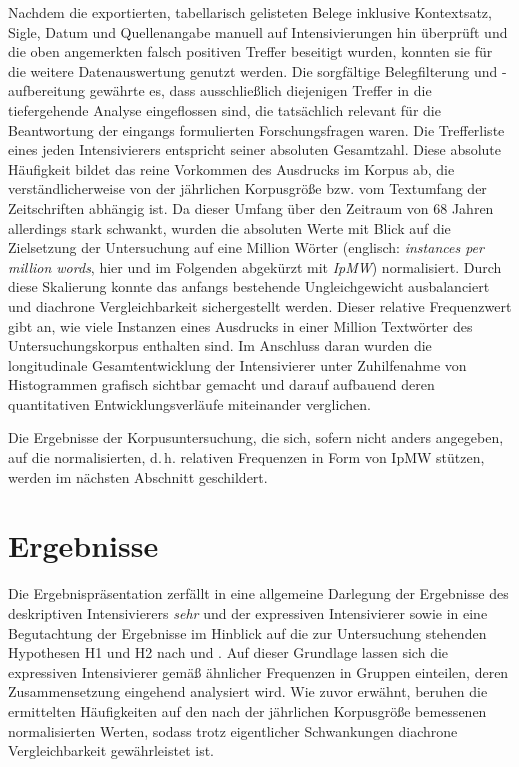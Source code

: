 Nachdem die exportierten, tabellarisch gelisteten Belege inklusive Kontextsatz, Sigle, Datum und Quellenangabe manuell auf Intensivierungen hin überprüft und die oben angemerkten falsch positiven Treffer beseitigt wurden, konnten sie für die weitere Datenauswertung genutzt werden. Die sorgfältige Belegfilterung und -aufbereitung gewährte es, dass ausschließlich diejenigen Treffer in die tiefergehende Analyse eingeflossen sind, die tatsächlich relevant für die Beantwortung der eingangs formulierten Forschungsfragen waren. Die Trefferliste eines jeden Intensivierers entspricht seiner absoluten Gesamtzahl. Diese absolute Häufigkeit bildet das reine Vorkommen des Ausdrucks im Korpus ab, die verständlicherweise von der jährlichen Korpusgröße bzw. vom Textumfang der Zeitschriften abhängig ist. Da dieser Umfang über den Zeitraum von 68 Jahren allerdings stark schwankt, wurden die absoluten Werte mit Blick auf die Zielsetzung der Untersuchung auf eine Million Wörter (englisch: \textit{instances per million words}, hier und im Folgenden abgekürzt mit \textit{IpMW}) normalisiert. Durch diese Skalierung konnte das anfangs bestehende Ungleichgewicht ausbalanciert und diachrone Vergleichbarkeit sichergestellt werden. Dieser relative Frequenzwert gibt an, wie viele Instanzen eines Ausdrucks in einer Million Textwörter des Untersuchungskorpus enthalten sind. Im Anschluss daran wurden die longitudinale Gesamtentwicklung der Intensivierer unter Zuhilfenahme von Histogrammen grafisch sichtbar gemacht und darauf aufbauend deren quantitativen Entwicklungsverläufe miteinander verglichen.

Die Ergebnisse der Korpusuntersuchung, die sich, sofern nicht anders angegeben, auf die normalisierten, d.\,h. relativen Frequenzen in Form von IpMW stützen, werden im nächsten Abschnitt geschildert.

\section{Ergebnisse}
Die Ergebnispräsentation zerfällt in eine allgemeine Darlegung der Ergebnisse des deskriptiven Intensivierers \textit{sehr} und der expressiven Intensivierer sowie in eine Begutachtung der Ergebnisse im Hinblick auf die zur Untersuchung stehenden Hypothesen H1 und H2 nach \citet[2]{Hauschild.1899} und \citet[274]{Baumgarten.1908}. Auf dieser Grundlage lassen sich die expressiven Intensivierer gemäß ähnlicher Frequenzen in Gruppen einteilen, deren Zusammensetzung eingehend analysiert wird. Wie zuvor erwähnt, beruhen die ermittelten Häufigkeiten auf den nach der jährlichen Korpusgröße bemessenen normalisierten Werten, sodass trotz eigentlicher Schwankungen diachrone Vergleichbarkeit gewährleistet ist.

